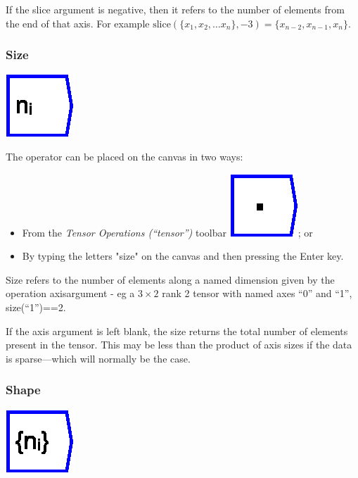 If the slice argument is negative, then it refers to the number of
elements from the end of that axis. For example $\mathrm{slice}(\{x_{1},x_{2},\ldots x_{n}\},-3)=\{x_{n-2},x_{n-1},x_{n}\}$.

\subsubsection{Size}

\label{Operation:size}

\includegraphics{images/size}

The operator can be placed on the canvas in two ways:
\begin{itemize}
\item From the \emph{Tensor Operations (``tensor'')} toolbar \includegraphics{images/innerProduct};
or 
\item By typing the letters "size" on the canvas and then pressing the
Enter key.
\end{itemize}
Size refers to the number of elements along a named dimension given
by the operation axisargument - eg a $3\times2$ rank 2 tensor with
named axes ``0'' and ``1'', size(``1'')==2.

If the axis argument is left blank, the size returns the total number
of elements present in the tensor. This may be less than the product
of axis sizes if the data is sparse---which will normally be the
case.

\subsubsection{Shape}

\label{Operation:shape}

\includegraphics{images/shape}

